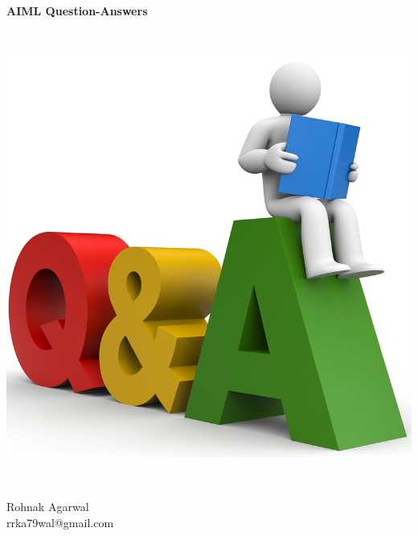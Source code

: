 \begingroup
\thispagestyle{empty}
\centering

\normalfont\color{black}\fontsize{35}{35}\sffamily\selectfont
\textbf{AIML Question-Answers}\\

~\vfill

\includegraphics[width=0.5\paperwidth,height=0.5\paperheight,keepaspectratio]{images/qa.png}

~\vfill

\raggedleft
\normalfont\color{blue}\fontsize{35}{35}\sffamily\selectfont
{\Huge Rohnak Agarwal}\\[-12pt]%
{\centering \normalfont\fontsize{15}{15}\selectfont rrka79wal@gmail.com}\\
\endgroup
\restoregeometry
